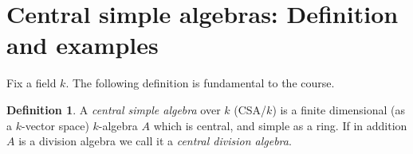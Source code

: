 \documentclass[11pt]{amsart}
\numberwithin{equation}{section}
\theoremstyle{remark}
\newtheorem{remark}[equation]{Remark}
\theoremstyle{remark}
\theoremstyle{remark}
\theoremstyle{definition}
\newtheorem{example}[equation]{Example}
\theoremstyle{definition}
\theoremstyle{definition}
\newtheorem{defi}[equation]{Definition}
\theoremstyle{definition}
\theoremstyle{definition}
\theoremstyle{definition}
\begin{document}
%
%
%
%
%

\section{Central simple algebras: Definition and examples}

 Fix a field $k$. The following definition is fundamental to the course. 

\begin{defi}
A \textit{central simple algebra} over $k$ (CSA/$k$) is a finite dimensional (as a $k$-vector space) $k$-algebra $A$ which is central, and simple as a ring. If in addition $A$ is a division algebra we call it a \textit{central division algebra}. 
\end{defi}
\end{document}
